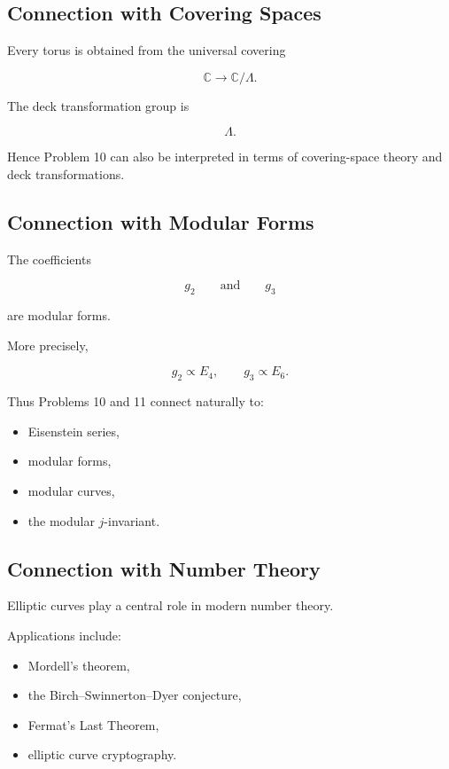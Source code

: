 \documentclass[12pt,a4paper]{article}
\theoremstyle{notespace}
\begin{document}
\subsection{Connection with Covering Spaces}

Every torus is obtained from the universal covering

\[
\mathbb C
\longrightarrow
\mathbb C/\Lambda.
\]

The deck transformation group is

\[
\Lambda.
\]

Hence Problem 10 can also be interpreted in terms of covering-space theory and deck transformations.

\subsection{Connection with Modular Forms}

The coefficients

\[
g_2
\qquad\text{and}\qquad
g_3
\]

are modular forms.

More precisely,

\[
g_2 \propto E_4,
\qquad
g_3 \propto E_6.
\]

Thus Problems 10 and 11 connect naturally to:

\begin{itemize}
	\item Eisenstein series,
	\item modular forms,
	\item modular curves,
	\item the modular \(j\)-invariant.
\end{itemize}

\subsection{Connection with Number Theory}

Elliptic curves play a central role in modern number theory.

Applications include:

\begin{itemize}
	\item Mordell's theorem,
	\item the Birch--Swinnerton--Dyer conjecture,
	\item Fermat's Last Theorem,
	\item elliptic curve cryptography.
\end{itemize}
\end{document}
